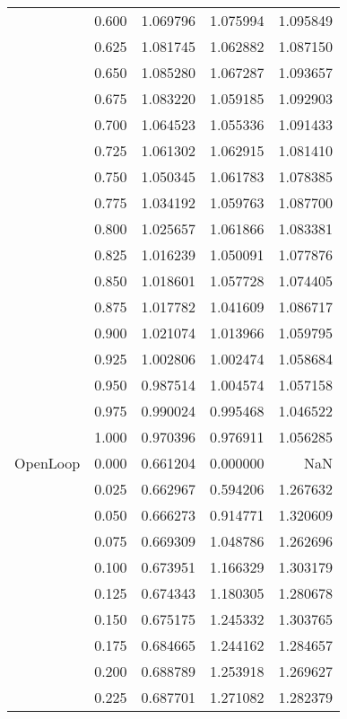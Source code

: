 \begin{tabular}{llrrr}
         & 0.600 &   1.069796 &   1.075994 &   1.095849 \\
         & 0.625 &   1.081745 &   1.062882 &   1.087150 \\
         & 0.650 &   1.085280 &   1.067287 &   1.093657 \\
         & 0.675 &   1.083220 &   1.059185 &   1.092903 \\
         & 0.700 &   1.064523 &   1.055336 &   1.091433 \\
         & 0.725 &   1.061302 &   1.062915 &   1.081410 \\
         & 0.750 &   1.050345 &   1.061783 &   1.078385 \\
         & 0.775 &   1.034192 &   1.059763 &   1.087700 \\
         & 0.800 &   1.025657 &   1.061866 &   1.083381 \\
         & 0.825 &   1.016239 &   1.050091 &   1.077876 \\
         & 0.850 &   1.018601 &   1.057728 &   1.074405 \\
         & 0.875 &   1.017782 &   1.041609 &   1.086717 \\
         & 0.900 &   1.021074 &   1.013966 &   1.059795 \\
         & 0.925 &   1.002806 &   1.002474 &   1.058684 \\
         & 0.950 &   0.987514 &   1.004574 &   1.057158 \\
         & 0.975 &   0.990024 &   0.995468 &   1.046522 \\
         & 1.000 &   0.970396 &   0.976911 &   1.056285 \\
OpenLoop & 0.000 &   0.661204 &   0.000000 &        NaN \\
         & 0.025 &   0.662967 &   0.594206 &   1.267632 \\
         & 0.050 &   0.666273 &   0.914771 &   1.320609 \\
         & 0.075 &   0.669309 &   1.048786 &   1.262696 \\
         & 0.100 &   0.673951 &   1.166329 &   1.303179 \\
         & 0.125 &   0.674343 &   1.180305 &   1.280678 \\
         & 0.150 &   0.675175 &   1.245332 &   1.303765 \\
         & 0.175 &   0.684665 &   1.244162 &   1.284657 \\
         & 0.200 &   0.688789 &   1.253918 &   1.269627 \\
         & 0.225 &   0.687701 &   1.271082 &   1.282379 \\

\end{tabular}
